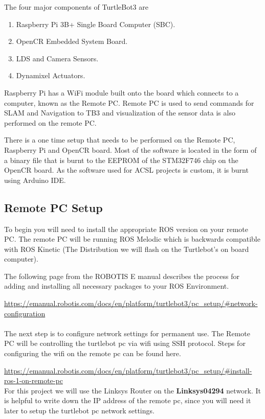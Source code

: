 \documentclass[12]{article}
\begin{document}
The four major components of TurtleBot3 are 
\begin{enumerate}
	\item {Raspberry Pi 3B+ Single Board Computer (SBC).}
	\item {OpenCR Embedded System Board.}
	\item {LDS and Camera Sensors.}
	\item {Dynamixel Actuators.}
\end{enumerate}

Raspberry Pi has a WiFi module built onto the board which connects to a computer, known as the Remote PC. Remote PC is used to send commands for SLAM and Navigation to TB3 and visualization of the sensor data is also performed on the remote PC.

There is a one time setup that needs to be performed on the Remote PC, Raspberry Pi and OpenCR board. Most of the software is located in the form of a binary file that is burnt to the EEPROM of the STM32F746 chip on the OpenCR board. As the software used for ACSL projects is custom, it is burnt using Arduino IDE.
 
\subsection{Remote PC Setup}

To begin you will need to install the appropriate ROS version on your remote PC. The remote PC will be running ROS Melodic which is backwards compatible with ROS Kinetic (The Distribution we will flash on the Turtlebot's on board computer).

The following page from the ROBOTIS E manual describes the process for adding and installing all necessary packages to your ROS Environment.

\url {https://emanual.robotis.com/docs/en/platform/turtlebot3/pc_setup/#network-configuration} \\\\

The next step is to configure network settings for permanent use. The Remote PC will be controlling the turtlebot pc via wifi using SSH protocol. Steps for configuring the wifi on the remote pc can be found here.

\url {https://emanual.robotis.com/docs/en/platform/turtlebot3/pc_setup/#install-ros-1-on-remote-pc} \\

For this project we will use the Linksys Router on the \textbf{Linksys04294} network. It is helpful to write down the IP address of the remote pc, since you will need it later to setup the turtlebot pc network settings.\\\\
\end{document}
